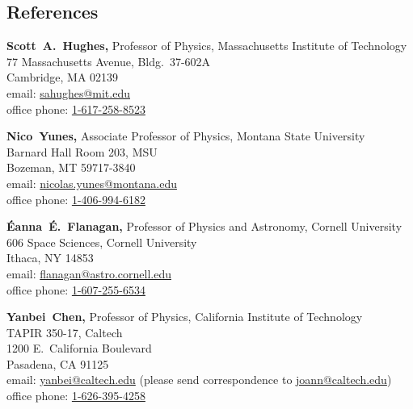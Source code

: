 \documentclass[margin,line]{res}
\begin{document}
\begin{resume}
\section{\sc References}
\vspace*{.05in}
\parbox{\textwidth}{%
{\bf Scott~A.~Hughes,} Professor of Physics, Massachusetts Institute of Technology \\
77 Massachusetts Avenue, Bldg.\ 37-602A \\
Cambridge, MA 02139 \\
email: \href{mailto:sahughes@mit.edu}{sahughes@mit.edu} \\
office phone: \href{tel:1-617-258-8523}{1-617-258-8523}}
\par
\parbox{\textwidth}{%
{\bf Nico~Yunes,} Associate Professor of Physics, Montana State University\\
Barnard Hall Room 203, MSU\\
Bozeman, MT 59717-3840\\
email: \href{mailto:nicolas.yunes@montana.edu}{nicolas.yunes@montana.edu} \\
office phone: \href{tel:1-406-994-6182}{1-406-994-6182}}
\par
\parbox{\textwidth}{%
{\bf {\'E}anna~{\'E}.~Flanagan,} Professor of Physics and Astronomy,
Cornell University\\
606 Space Sciences, Cornell University\\
Ithaca, NY 14853\\
email: \href{mailto:flanagan@astro.cornell.edu}{flanagan@astro.cornell.edu}\\
office phone: \href{tel:1-607-255-6534}{1-607-255-6534}}
\par
\parbox{\textwidth}{%
{\bf Yanbei~Chen,} Professor of Physics,
California Institute of Technology\\
TAPIR 350-17, Caltech\\
1200 E.\ California Boulevard\\
Pasadena, CA 91125\\
email: \href{mailto:yanbei@caltech.edu}{yanbei@caltech.edu}
(please send correspondence to \href{mailto:joann@caltech.edu}{joann@caltech.edu})
\\
office phone: \href{tel:1-626-395-4258}{1-626-395-4258}}

\end{resume}
\end{document}
